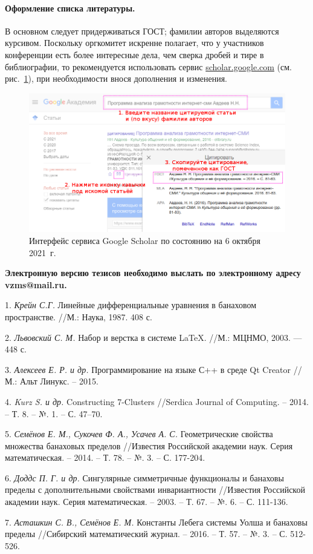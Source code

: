 \documentclass{vzmsthesis}
\begin{document}
\paragraph{Оформление списка литературы.}
В основном следует придерживаться ГОСТ;
фамилии авторов выделяются курсивом.
Поскольку оргкомитет искренне полагает, что у участников конференции есть более интересные дела,
чем сверка дробей и тире в библиографии,
то рекомендуется использовать сервис \href{https://scholar.google.com/}{scholar.google.com}
(см. рис.~\ref{Ivanoff:fig:google-scholar}),
при необходимости внося дополнения и изменения.

\begin{figure}
	\centering
	\includegraphics[width=\linewidth]{pic/google-scholar.png}
	\caption{Интерфейс сервиса Google Scholar по состоянию на 6 октября 2021~г.}
	\label{Ivanoff:fig:google-scholar}
\end{figure}


\begin{center}
	\textbf{Электронную версию тезисов необходимо выслать по электронному адресу vzms@mail.ru.}
\end{center}

\litlist

1. {\it Крейн С.Г.} Линейные дифференциальные уравнения в банаховом пространстве. //М.: Наука, 1987. 408 с.

2. {\it Львовский С. М.} Набор и верстка в системе \LaTeX. //М.: МЦНМО, 2003. — 448 с.

3. {\it Алексеев Е. Р. и др.} Программирование на языке С++ в среде Qt Creator //М.: Альт Линукс. – 2015.

4. {\it Kurz S.  и др.} Constructing 7-Clusters //Serdica Journal of Computing. – 2014. – Т. 8. – №. 1. – С. 47–70.

5. {\it Семёнов Е. М., Сукочев Ф. А., Усачев А. С.} Геометрические свойства множества банаховых пределов //Известия Российской академии наук. Серия математическая. – 2014. – Т. 78. – №. 3. – С. 177-204.

6. {\it Доддс П. Г. и др.} Сингулярные симметричные функционалы и банаховы пределы с дополнительными свойствами инвариантности //Известия Российской академии наук. Серия математическая. – 2003. – Т. 67. – №. 6. – С. 111-136.

7. {\it Асташкин С. В., Семёнов Е. М.} Константы Лебега системы Уолша и банаховы пределы //Сибирский математический журнал. – 2016. – Т. 57. – №. 3. – С. 512-526.
\end{document}
